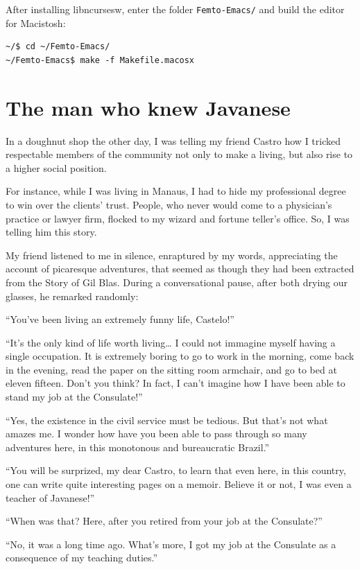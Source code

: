 \documentclass[a4paper,12pt]{book}
\begin{document}
After installing libncursesw, enter the folder \verb|Femto-Emacs/|
and build the editor for Macistosh:
\begin{verbatim}
~/$ cd ~/Femto-Emacs/ 
~/Femto-Emacs$ make -f Makefile.macosx
\end{verbatim}


\chapter{The man who knew Javanese}
In a doughnut shop the other day,
I was telling my friend Castro
how I tricked respectable members of the
community not only to make a living,
but also rise to a higher social position.

For instance, while I was living in Manaus,
I had to hide my professional degree to win
over the clients' trust. People, who never would
come to a physician's practice or lawyer firm,
flocked to my wizard and fortune teller's office.
So, I was telling him this story.

My friend listened to me in silence,
enraptured by my words,
appreciating the account of picaresque adventures,
that seemed as though they had been
extracted from the Story of Gil Blas.
During a conversational pause,
after both drying our glasses,
he remarked randomly:

``You've been living an extremely funny life, Castelo!''

``It's the only kind of life worth living\ldots
I could not immagine
myself having a single occupation.
It is extremely boring
to go to work in the morning,
come back in the evening, read the paper
on the sitting room armchair,
and go to bed at eleven fifteen.
Don't you think?
In fact, I can't imagine how I have been
able to stand my job at the Consulate!''


``Yes, the existence in the civil service
must be tedious. But that's not
what amazes me. I wonder how have you been
able to pass through so many adventures here,
in this monotonous and bureaucratic Brazil.''

``You will be surprized, my dear Castro,
to learn that even here, in this country,
one can write quite interesting pages on a
memoir. Believe it or not,
I was even a teacher of Javanese!''

``When was that? Here, after you retired
from your job at the Consulate?''


``No, it was a long time ago.
What's more, I got my job at the
Consulate as a consequence of my
teaching duties.''
\end{document}
